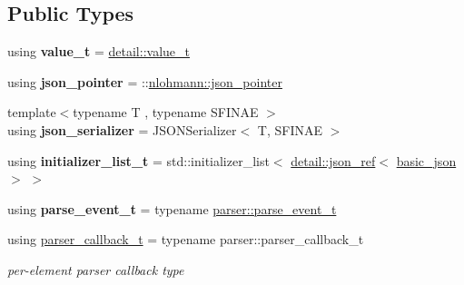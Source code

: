 \subsection*{Public Types}
\begin{DoxyCompactItemize}
\item 
\mbox{\label{classnlohmann_1_1basic__json_ae8cbef097f7da18a781fc86587de6b90}} 
using {\bfseries value\+\_\+t} = \mbox{\hyperlink{namespacenlohmann_1_1detail_a90aa5ef615aa8305e9ea20d8a947980f}{detail\+::value\+\_\+t}}
\item 
\mbox{\label{classnlohmann_1_1basic__json_a32d3ee58bf01b28d11366f307518bf34}} 
using {\bfseries json\+\_\+pointer} = \+::\mbox{\hyperlink{classnlohmann_1_1json__pointer}{nlohmann\+::json\+\_\+pointer}}
\item 
\mbox{\label{classnlohmann_1_1basic__json_a7768841baaaa7a21098a401c932efaff}} 
{\footnotesize template$<$typename T , typename S\+F\+I\+N\+AE $>$ }\\using {\bfseries json\+\_\+serializer} = J\+S\+O\+N\+Serializer$<$ T, S\+F\+I\+N\+AE $>$
\item 
\mbox{\label{classnlohmann_1_1basic__json_ad70a098fbc01c53497db29d3b5b656a9}} 
using {\bfseries initializer\+\_\+list\+\_\+t} = std\+::initializer\+\_\+list$<$ \mbox{\hyperlink{classnlohmann_1_1detail_1_1json__ref}{detail\+::json\+\_\+ref}}$<$ \mbox{\hyperlink{classnlohmann_1_1basic__json}{basic\+\_\+json}} $>$ $>$
\item 
\mbox{\label{classnlohmann_1_1basic__json_aaceba2e4cf75fc983bb75c78c8742e65}} 
using {\bfseries parse\+\_\+event\+\_\+t} = typename \mbox{\hyperlink{classnlohmann_1_1detail_1_1parser_a37ac88c864dda495f72cb62776b0bebe}{parser\+::parse\+\_\+event\+\_\+t}}
\item 
using \mbox{\hyperlink{classnlohmann_1_1basic__json_ab4f78c5f9fd25172eeec84482e03f5b7}{parser\+\_\+callback\+\_\+t}} = typename parser\+::parser\+\_\+callback\+\_\+t
\begin{DoxyCompactList}\small\item\em per-\/element parser callback type \end{DoxyCompactList}\end{DoxyCompactItemize}
